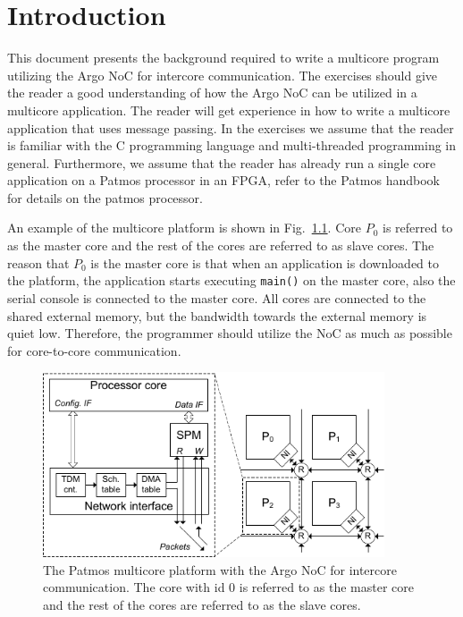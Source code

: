 \documentclass[a4paper,fontsize=10pt,twoside,DIV15,BCOR12mm,headinclude=true,footinclude=false,pagesize,bibtotoc]{scrbook}
\newcommand{\code}[1]{{\texttt{#1}}}
\begin{document}
\mainmatter

\chapter{Introduction}

This document presents the background required to write a multicore program utilizing the Argo NoC for intercore communication.
The exercises should give the reader a good understanding of how the Argo NoC can be utilized in a multicore application.
The reader will get experience in how to write a multicore application that uses message passing.
In the exercises we assume that the reader is familiar with the C programming language and multi-threaded programming in general.
Furthermore, we assume that the reader has already run a single core application on a Patmos processor in an FPGA, refer to the Patmos handbook~\cite{patmos-handbook} for details on the patmos processor.

An example of the multicore platform is shown in Fig.~\ref{fig:mc-patmos}. Core $P_0$ is referred to as the master core and the rest of the cores are referred to as slave cores. The reason that $P_0$ is the master core is that when an application is downloaded to the platform, the application starts executing \code{main()} on the master core, also the serial console  is connected to the master core. All cores are connected to the shared external memory, but the bandwidth towards the external memory is quiet low.
Therefore, the programmer should utilize the NoC as much as possible for core-to-core communication.
\begin{figure}[h]
\centering
\includegraphics[width=0.9\textwidth]{fig/MultiCore.pdf}
\caption{The Patmos multicore platform with the Argo NoC for intercore communication.
The core with id 0 is referred to as the master core and the rest of the cores are referred to as the slave cores.}
\label{fig:mc-patmos}
\end{figure}
\end{document}
